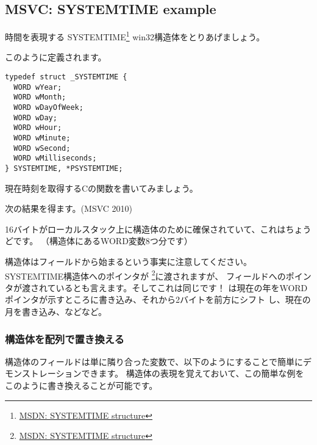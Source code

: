 ﻿\subsection{MSVC: SYSTEMTIME example}
\label{sec:SYSTEMTIME}

\newcommand{\FNSYSTEMTIME}{\footnote{\href{http://msdn.microsoft.com/en-us/library/ms724950(VS.85).aspx}{MSDN: SYSTEMTIME structure}}}

時間を表現する SYSTEMTIME\FNSYSTEMTIME{} win32構造体をとりあげましょう。

このように定義されます。

\begin{lstlisting}[caption=WinBase.h,style=customc]
typedef struct _SYSTEMTIME {
  WORD wYear;
  WORD wMonth;
  WORD wDayOfWeek;
  WORD wDay;
  WORD wHour;
  WORD wMinute;
  WORD wSecond;
  WORD wMilliseconds;
} SYSTEMTIME, *PSYSTEMTIME;
\end{lstlisting}

現在時刻を取得するCの関数を書いてみましょう。



次の結果を得ます。(MSVC 2010)



16バイトがローカルスタック上に構造体のために確保されていて、これはちょうどです。
（構造体にあるWORD変数8つ分です）

\newcommand{\FNMSDNGST}{\footnote{\href{http://msdn.microsoft.com/en-us/library/ms724390(VS.85).aspx}{MSDN: GetSystemTime function}}}

構造体はフィールドから始まるという事実に注意してください。
SYSTEMTIME構造体へのポインタが \FNSYSTEMTIME に渡されますが、
フィールドへのポインタが渡されているとも言えます。そしてこれは同じです！
は現在の年をWORDポインタが示すところに書き込み、それから2バイトを前方にシフト
し、現在の月を書き込み、などなど。



\subsubsection{構造体を配列で置き換える}

構造体のフィールドは単に隣り合った変数で、以下のようにすることで簡単にデモンストレーションできます。
構造体の表現を覚えておいて、この簡単な例をこのように書き換えることが可能です。

